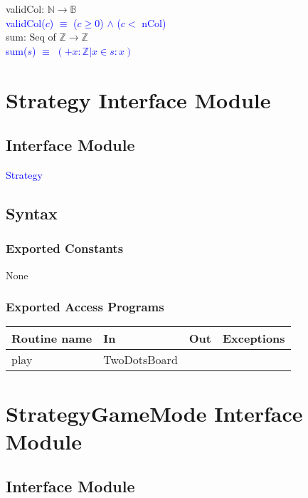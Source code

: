 \documentclass[12pt]{article}
\begin{document}
\begin{itemize}
\begin{itemize}
\begin{itemize}
\noindent validCol: $\mathbb{N} \rightarrow \mathbb{B}$\\
\noindent \textcolor{blue}{validCol($c$) $\equiv$ ($c \geq 0$) $\land$ ($c < $ nCol)}\\
  
\noindent sum: Seq of $\mathbb{Z} \rightarrow \mathbb{Z}$\\
\noindent \textcolor{blue}{sum($s$) $\equiv$ $(+x : \mathbb{Z} | x \in s: x)$}



\newpage

\section* {Strategy Interface Module}

\subsection* {Interface Module}

\noindent \textcolor{blue}{Strategy}

\subsection* {Syntax}

\subsubsection* {Exported Constants}

None

\subsubsection* {Exported Access Programs}

\begin{tabular}{| l | l | l | p{6cm} |}
\hline
\textbf{Routine name} & \textbf{In} & \textbf{Out} & \textbf{Exceptions}\\
\hline
play & TwoDotsBoard & & \\
\hline
\end{tabular}

\newpage

\section* {StrategyGameMode Interface Module}

\subsection* {Interface Module}


\end{itemize}
\end{itemize}
\end{itemize}
\end{document}
